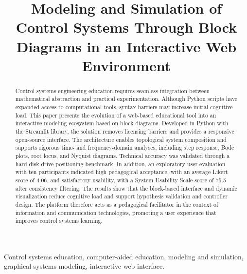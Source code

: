 \documentclass[conference]{IEEEtran}
\begin{document}
\title{Modeling and Simulation of Control Systems Through Block Diagrams in an Interactive Web Environment}

\author{
}

\maketitle

\begin{abstract}
Control systems engineering education requires seamless integration between mathematical abstraction and practical experimentation. Although Python scripts have expanded access to computational tools, syntax barriers may increase initial cognitive load. This paper presents the evolution of a web-based educational tool into an interactive modeling ecosystem based on block diagrams. Developed in Python with the Streamlit library, the solution removes licensing barriers and provides a responsive open-source interface. The architecture enables topological system composition and supports rigorous time- and frequency-domain analyses, including step response, Bode plots, root locus, and Nyquist diagrams. Technical accuracy was validated through a hard disk drive positioning benchmark. In addition, an exploratory user evaluation with ten participants indicated high pedagogical acceptance, with an average Likert score of 4.06, and satisfactory usability, with a System Usability Scale score of 75.5 after consistency filtering. The results show that the block-based interface and dynamic visualization reduce cognitive load and support hypothesis validation and controller design. The platform therefore acts as a pedagogical facilitator in the context of information and communication technologies, promoting a user experience that improves control systems learning.
\end{abstract}

\begin{IEEEkeywords}
Control systems education, computer-aided education, modeling and simulation, graphical systems modeling, interactive web interface.
\end{IEEEkeywords}
\end{document}
